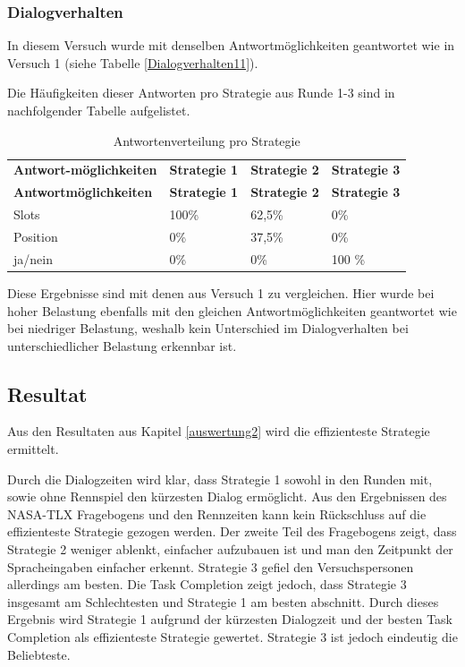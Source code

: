 \documentclass[12pt,a4paper]{scrartcl}
\begin{document}
\subsubsection{Dialogverhalten}
\label{DV2}
In diesem Versuch wurde mit denselben Antwortmöglichkeiten geantwortet wie in Versuch 1 (siehe Tabelle \ref{Dialogverhalten11}).

Die Häufigkeiten dieser Antworten pro Strategie aus Runde 1-3 sind in nachfolgender Tabelle aufgelistet.

\begin{longtable}{p{3cm}p{3cm}p{3cm}p{3cm} }
	\label{Dialogverhalten12}\\
	\caption[Antwortenverteilung pro Strategie]{Antwortenverteilung pro Strategie}\\
	\hline
\textbf{Antwort-möglichkeiten}&\textbf{Strategie 1}&\textbf{Strategie 2} &\textbf{Strategie 3}\\
	\hline
	\endfirsthead
	\hline
	\textbf{Antwortmöglichkeiten}&\textbf{Strategie 1}&\textbf{Strategie 2} &\textbf{Strategie 3}\\
	\hline
	\endhead
Slots & 100\% & 62,5\%\ & 0\%  \\
Position & 0\% & 37,5\% & 0\%  \\
ja/nein & 0\% & 0\%  & 100 \%  \\
\hline
\end{longtable}
Diese Ergebnisse sind mit denen aus Versuch 1 zu vergleichen. 
Hier wurde bei hoher Belastung ebenfalls mit den gleichen Antwortmöglichkeiten geantwortet wie bei niedriger Belastung, weshalb kein Unterschied im Dialogverhalten bei unterschiedlicher Belastung erkennbar ist. 




\subsection{Resultat}
Aus den Resultaten aus Kapitel \ref{auswertung2} wird die effizienteste Strategie ermittelt. \newline

Durch die Dialogzeiten wird klar, dass Strategie 1 sowohl in den Runden mit, sowie ohne Rennspiel den kürzesten Dialog ermöglicht. Aus den Ergebnissen des NASA-TLX Fragebogens und den Rennzeiten kann kein Rückschluss auf die effizienteste Strategie gezogen werden. Der zweite Teil des Fragebogens zeigt, dass Strategie 2 weniger ablenkt, einfacher aufzubauen ist und man den Zeitpunkt der Spracheingaben einfacher erkennt. Strategie 3 gefiel den Versuchspersonen allerdings am besten. Die Task Completion zeigt jedoch, dass Strategie 3 insgesamt am Schlechtesten und Strategie 1 am besten abschnitt. \newline
Durch dieses Ergebnis wird Strategie 1 aufgrund der kürzesten Dialogzeit und der besten Task Completion als effizienteste Strategie gewertet. Strategie 3 ist jedoch eindeutig die Beliebteste. 
\end{document}
